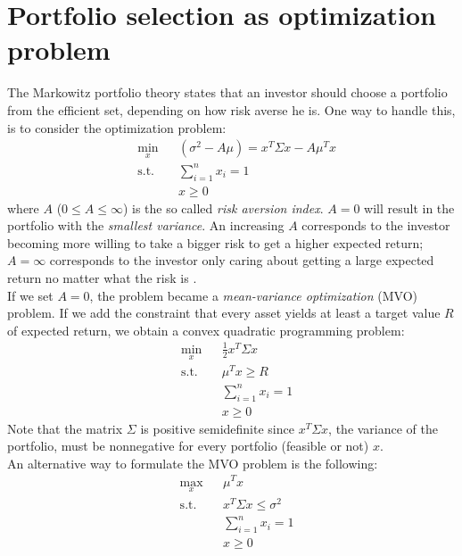 \section{Portfolio selection as optimization problem}
The Markowitz portfolio theory states that an investor should
choose a portfolio from the efficient set, depending on how risk averse he is. One way to handle this, is to consider the optimization problem\footnotemark[1]:
\begin{equation}
\begin{aligned}
&\min_x &&(\sigma^2 - A\mu) = x^T \Sigma x - A\mu^T x\\
&\text{s.t.}&&\sum\limits_{i=1}^n x_i=1\\
&&&x \geq 0
\end{aligned}
\end{equation}
where $A$ ($0 \leq A \leq \infty$) is the so called \textit{risk aversion index}. $A = 0$ will result in the portfolio with the \textit{smallest variance}. An increasing $A$ corresponds to the investor becoming more willing to take a bigger risk to get a higher expected return; $A = \infty$ corresponds to the investor only caring about getting a large expected return no matter what the risk is \cite{markovitz}.\\
If we set $A=0$, the problem became a \textit{mean-variance
optimization} (MVO) problem. If we add the constraint that every asset yields at least a target value $R$ of expected return, we obtain a convex quadratic programming problem:
\begin{equation}\label{eq:variance}
\begin{aligned}
&\min_x &&\frac{1}{2}x^T \Sigma x\\
&\text{s.t.}
&&\mu^T x \geq R\\
&&&\sum\limits_{i=1}^n x_i=1\\
&&&x \geq 0
\end{aligned}
\end{equation}
Note that the matrix $\Sigma$ is positive semidefinite since $x^T \Sigma x$, the variance of the portfolio, must be nonnegative for every portfolio (feasible or not) $x$.\\
An alternative way to formulate the MVO problem is the following:
\begin{equation}\label{eq:variance2}
\begin{aligned}
&\max_x &&\mu^Tx\\
&\text{s.t.}
&&x^T \Sigma x \leq \sigma^2\\
&&&\sum\limits_{i=1}^n x_i=1\\
&&&x \geq 0
\end{aligned}
\end{equation}

